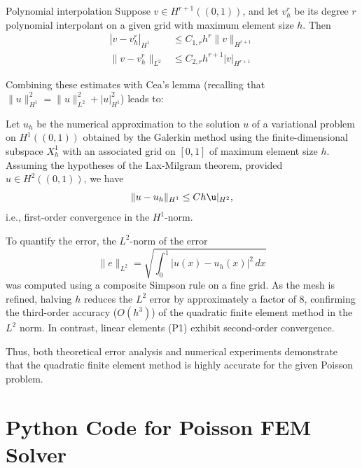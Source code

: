 \documentclass[a4paper,10pt]{article}
\begin{document}
\begin{lemma}{Polynomial interpolation}{}
	Suppose \(v \in H^{r+1}((0, 1))\), and let \(v_h^r\) be its degree \(r\) polynomial interpolant on a given grid with maximum element size \(h\). Then
	\begin{align*}
		|v - v_h^r|_{H^1}   & \leq C_{1,r} h^r \|v\|_{H^{r+1}}   \\
		\|v - v_h^r\|_{L^2} & \leq C_{2,r} h^{r+1} |v|_{H^{r+1}}
	\end{align*}
\end{lemma}

Combining these estimates with Cea's lemma (recalling that \(\|u\|_{H^1}^2 = \|u\|_{L^2}^2 + |u|_{H^1}^2\)) leads to:

\begin{corollary}{}{}
	Let \(u_h\) be the numerical approximation to the solution \(u\) of a variational problem on \(H^1((0, 1))\) obtained by the Galerkin method using the finite-dimensional subspace \(X_h^1\) with an associated grid on \([0, 1]\) of maximum element size \(h\). Assuming the hypotheses of the Lax-Milgram theorem, provided \(u \in H^2((0, 1))\), we have
	\[
		\|u - u_h\|_{H^1} \leq Ch \u|_{H^2},
	\]
	i.e., first-order convergence in the \(H^1\)-norm.
\end{corollary}

To quantify the error, the \(L^2\)-norm of the error
\[
	\|e\|_{L^2} = \sqrt{\int_0^1 |u(x)-u_h(x)|^2\,dx}
\]
was computed using a composite Simpson rule on a fine grid.
As the mesh is refined, halving \(h\) reduces the \(L^2\) error by approximately a factor of 8, confirming the third-order accuracy (\(O(h^3)\)) of the quadratic finite element method in the \(L^2\) norm. In contrast, linear elements (P1) exhibit second-order convergence.

Thus, both theoretical error analysis and numerical experiments demonstrate that the quadratic finite element method is highly accurate for the given Poisson problem.

\clearpage
\appendix
\section{Python Code for Poisson FEM Solver}
\inputminted{python}{problem_1/FEMpoisson.py}
\end{document}
